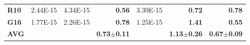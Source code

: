 \documentclass[encoding=utf8,british]{tumphthesis}
\begin{document}
\begin{table}[H]
\begin{subtable}{1.0\textwidth}
{\begin{tabular}{|l|llr|lr|r|}
\textbf{R10}                              & 2.44E-15                                             & 4.34E-15                                              & \textbf{0.56}                                    & 3.39E-15                                                       & \textbf{0.72}                                    & \textbf{0.78}                                            \\
\rowcolor[HTML]{CFE2F3} 
\textbf{G16}                              & 1.77E-15                                             & 2.26E-15                                              & \textbf{0.78}                                    & 1.25E-15                                                       & \textbf{1.41}                                    & \textbf{0.55}                                            \\ \hline
\textbf{AVG}                             &                                                      &                                                       & \textbf{0.73$\pm$0.11}                           &                                                                & \textbf{1.13$\pm$0.26}                           & \textbf{0.67$\pm$0.09}                                  
\\ \hline
\end{tabular}}
    \end{subtable}

    \bigskip

    \hfill


\end{table}
\end{document}
